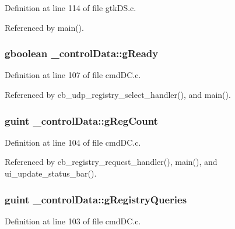 Definition at line 114 of file gtk\+D\+S.\+c.



Referenced by main().

\hypertarget{struct__control_data_a04238362a20b6616913d869fc464e4b2}{
\subsubsection[{g\+Ready}]{\setlength{\rightskip}{0pt plus 5cm}gboolean \+\_\+control\+Data\+::g\+Ready}}\label{struct__control_data_a04238362a20b6616913d869fc464e4b2}


Definition at line 107 of file cmd\+D\+C.\+c.



Referenced by cb\+\_\+udp\+\_\+registry\+\_\+select\+\_\+handler(), and main().

\hypertarget{struct__control_data_a81bfc0d50c23ebe6708e065659d11eb8}{
\subsubsection[{g\+Reg\+Count}]{\setlength{\rightskip}{0pt plus 5cm}guint \+\_\+control\+Data\+::g\+Reg\+Count}}\label{struct__control_data_a81bfc0d50c23ebe6708e065659d11eb8}


Definition at line 104 of file cmd\+D\+C.\+c.



Referenced by cb\+\_\+registry\+\_\+request\+\_\+handler(), main(), and ui\+\_\+update\+\_\+status\+\_\+bar().

\hypertarget{struct__control_data_ab4837eb7cc16bf85fe0bd839a428eaa5}{
\subsubsection[{g\+Registry\+Queries}]{\setlength{\rightskip}{0pt plus 5cm}guint \+\_\+control\+Data\+::g\+Registry\+Queries}}\label{struct__control_data_ab4837eb7cc16bf85fe0bd839a428eaa5}


Definition at line 103 of file cmd\+D\+C.\+c.



